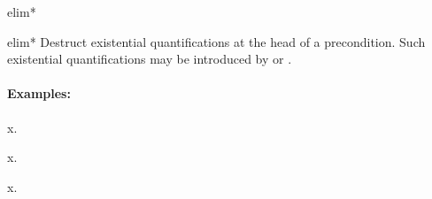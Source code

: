 \begin{tactic}{elim*}
  \begin{tsyntax}[empty]{elim*}
  Destruct existential quantifications at the head of a
  precondition. Such existential quantifications may be introduced by
   or .

  \paragraph{Examples:}\strut

  \begin{cmathpar}
    {\forall x.\, }%
    {}

    {\forall x.\, }%
    {}

    {\forall x.\, }%
    {}  
  \end{cmathpar}

  \end{tsyntax}
\end{tactic}
